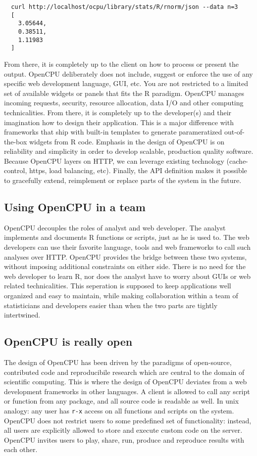 \documentclass{scrartcl}\usepackage[]{graphicx}\usepackage[]{color}
\begin{document}
\begin{verbatim}
  curl http://localhost/ocpu/library/stats/R/rnorm/json --data n=3
  [
    3.05644,
    0.38511,
    1.11983
  ]
\end{verbatim}

\noindent From there, it is completely up to the client on how to process or present the output. OpenCPU deliberately does not include, suggest or enforce the use of any specific web development language, GUI, etc. You are not restricted to a limited set of available widgets or panels that fits the R paradigm. OpenCPU manages incoming requests, security, resource allocation, data I/O and other computing technicalities. From there, it is completely up to the developer(s) and their imagination how to design their application. This is a major difference with frameworks that ship with built-in templates to generate parameratized out-of-the-box widgets from R code. Emphasis in the design of OpenCPU is on reliability and simplicity in order to develop scalable, production quality software. Because OpenCPU layers on HTTP, we can leverage existing technology (cache-control, https, load balancing, etc). Finally, the API definition makes it possible to gracefully extend, reimplement or replace parts of the system in the future.

\subsection{Using OpenCPU in a team}

OpenCPU decouples the roles of analyst and web developer. The analyst implements and documents R functions or scripts, just as he is used to. The web developers can use their favorite language, tools and web frameworks to call such analyses  over HTTP. OpenCPU provides the bridge between these two systems, without imposing additional constraints on either side. There is no need for the web developer to learn R, nor does the analyst have to worry about GUIs or web related technicalities. This seperation is supposed to keep applications well organized and easy to maintain, while making collaboration within a team of statisticians and developers easier than when the two parts are tightly intertwined.

\subsection{OpenCPU is really open}

The design of OpenCPU has been driven by the paradigms of open-source, contributed code and reproducibile research which are central to the domain of scientific computing. This is where the design of OpenCPU deviates from a web development frameworks in other languages. A client is allowed to call any script or function from any package, and all source code is readable as well. In unix analogy: any user has \texttt{r-x} access on all functions and scripts on the system. OpenCPU does not restrict users to some predefined set of functionality: instead, all users are explicitly allowed to store and execute custom code on the server. OpenCPU invites users to play, share, run, produce and reproduce results with each other.\\
\end{document}
